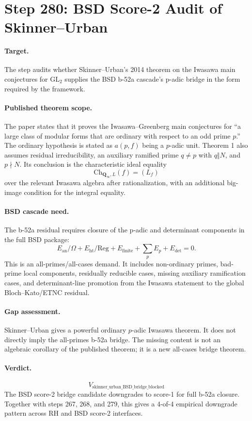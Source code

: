 \section*{Step 280: BSD Score-2 Audit of Skinner--Urban}

\paragraph{Target.}
The step audits whether Skinner--Urban's 2014 theorem on the Iwasawa main conjectures for \(\mathrm{GL}_2\) supplies the BSD b-52a cascade's p-adic bridge in the form required by the framework.

\paragraph{Published theorem scope.}
The paper states that it proves the Iwasawa--Greenberg main conjectures for ``a large class of modular forms that are ordinary with respect to an odd prime \(p\).''  The ordinary hypothesis is stated as \(a(p,f)\) being a \(p\)-adic unit.  Theorem 1 also assumes residual irreducibility, an auxiliary ramified prime \(q \ne p\) with \(q\Vert N\), and \(p\nmid N\).  Its conclusion is the characteristic ideal equality
\[
  \mathrm{Ch}_{\mathbf Q_\infty,L}(f)=(L_f)
\]
over the relevant Iwasawa algebra after rationalization, with an additional big-image condition for the integral equality.

\paragraph{BSD cascade need.}
The b-52a residual requires closure of the p-adic and determinant components in the full BSD package:
\[
  E_{\mathrm{an}}/\Omega + E_{\mathrm{ht}}/\mathrm{Reg} + E_{\mathrm{finite}}
  + \sum_p E_p + E_{\det}=0.
\]
This is an all-primes/all-cases demand.  It includes non-ordinary primes, bad-prime local components, residually reducible cases, missing auxiliary ramification cases, and determinant-line promotion from the Iwasawa statement to the global Bloch--Kato/ETNC residual.

\paragraph{Gap assessment.}
Skinner--Urban gives a powerful ordinary \(p\)-adic Iwasawa theorem.  It does not directly imply the all-primes b-52a bridge.  The missing content is not an algebraic corollary of the published theorem; it is a new all-cases bridge theorem.

\paragraph{Verdict.}
\[
  \boxed{V_{\mathrm{skinner\_urban\_BSD\_bridge\_blocked}}}
\]
The BSD score-2 bridge candidate downgrades to score-1 for full b-52a closure.  Together with steps 267, 268, and 279, this gives a 4-of-4 empirical downgrade pattern across RH and BSD score-2 interfaces.
